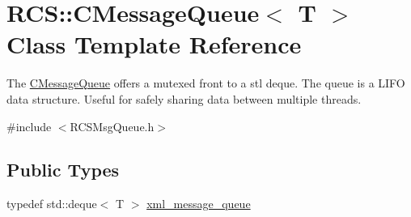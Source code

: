 \hypertarget{classRCS_1_1CMessageQueue}{\section{R\-C\-S\-:\-:C\-Message\-Queue$<$ T $>$ Class Template Reference}
\label{classRCS_1_1CMessageQueue}
}


The \hyperlink{classRCS_1_1CMessageQueue}{C\-Message\-Queue} offers a mutexed front to a stl deque. The queue is a L\-I\-F\-O data structure. Useful for safely sharing data between multiple threads.  




{\ttfamily \#include $<$R\-C\-S\-Msg\-Queue.\-h$>$}

\subsection*{Public Types}
\begin{DoxyCompactItemize}
\item 
typedef std\-::deque$<$ T $>$ \hyperlink{classRCS_1_1CMessageQueue_a272ec6240c0ae616f66e71a033326e28}{xml\-\_\-message\-\_\-queue}
\end{DoxyCompactItemize}
